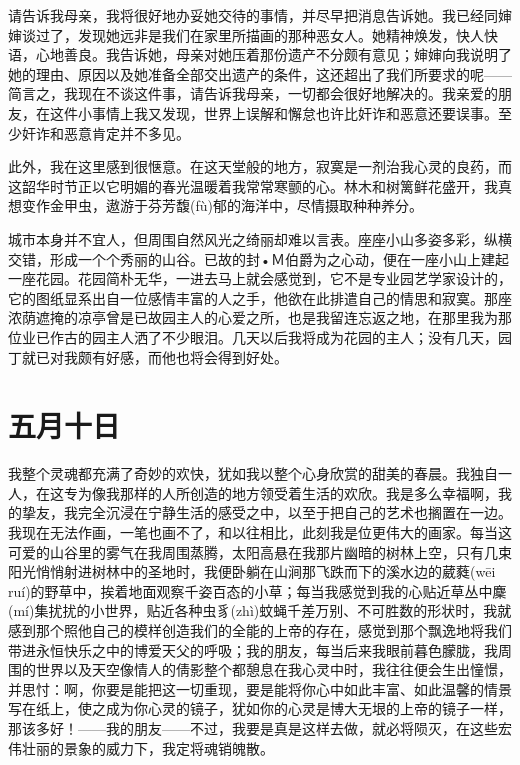 \documentclass[12pt,oneside]{book}
\begin{document}
请告诉我母亲，我将很好地办妥她交待的事情，并尽早把消息告诉她。我已经同婶婶谈过了，发现她远非是我们在家里所描画的那种恶女人。她精神焕发，快人快语，心地善良。我告诉她，母亲对她压着那份遗产不分颇有意见；婶婶向我说明了她的理由、原因以及她准备全部交出遗产的条件，这还超出了我们所要求的呢——简言之，我现在不谈这件事，请告诉我母亲，一切都会很好地解决的。我亲爱的朋友，在这件小事情上我又发现，世界上误解和懈怠也许比奸诈和恶意还要误事。至少奸诈和恶意肯定并不多见。

此外，我在这里感到很惬意。在这天堂般的地方，寂寞是一剂治我心灵的良药，而这韶华时节正以它明媚的春光温暖着我常常寒颤的心。林木和树篱鲜花盛开，我真想变作金甲虫，遨游于芬芳馥(fù)郁的海洋中，尽情摄取种种养分。

城市本身并不宜人，但周围自然风光之绮丽却难以言表。座座小山多姿多彩，纵横交错，形成一个个秀丽的山谷。已故的封•Ｍ伯爵为之心动，便在一座小山上建起一座花园。花园简朴无华，一进去马上就会感觉到，它不是专业园艺学家设计的，它的图纸显系出自一位感情丰富的人之手，他欲在此排遣自己的情思和寂寞。那座浓荫遮掩的凉亭曾是已故园主人的心爱之所，也是我留连忘返之地，在那里我为那位业已作古的园主人洒了不少眼泪。几天以后我将成为花园的主人；没有几天，园丁就已对我颇有好感，而他也将会得到好处。





\chapter{五月十日}
\label{sec-2-2}
我整个灵魂都充满了奇妙的欢快，犹如我以整个心身欣赏的甜美的春晨。我独自一人，在这专为像我那样的人所创造的地方领受着生活的欢欣。我是多么幸福啊，我的挚友，我完全沉浸在宁静生活的感受之中，以至于把自己的艺术也搁置在一边。我现在无法作画，一笔也画不了，和以往相比，此刻我是位更伟大的画家。每当这可爱的山谷里的雾气在我周围蒸腾，太阳高悬在我那片幽暗的树林上空，只有几束阳光悄悄射进树林中的圣地时，我便卧躺在山涧那飞跌而下的溪水边的葳蕤(wēi ruí)的野草中，挨着地面观察千姿百态的小草；每当我感觉到我的心贴近草丛中麇(mí)集扰扰的小世界，贴近各种虫豸(zhì)蚊蝇千差万别、不可胜数的形状时，我就感到那个照他自己的模样创造我们的全能的上帝的存在，感觉到那个飘逸地将我们带进永恒快乐之中的博爱天父的呼吸；我的朋友，每当后来我眼前暮色朦胧，我周围的世界以及天空像情人的倩影整个都憩息在我心灵中时，我往往便会生出憧憬，并思忖：啊，你要是能把这一切重现，要是能将你心中如此丰富、如此温馨的情景写在纸上，使之成为你心灵的镜子，犹如你的心灵是博大无垠的上帝的镜子一样，那该多好！——我的朋友——不过，我要是真是这样去做，就必将陨灭，在这些宏伟壮丽的景象的威力下，我定将魂销魄散。
\end{document}
